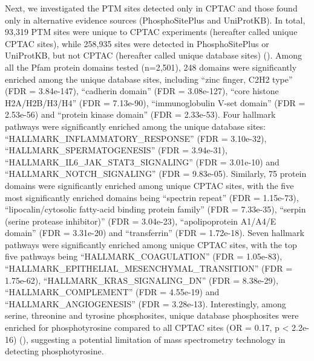 Next, we investigated the PTM sites detected only in CPTAC and those found only in alternative evidence sources (PhosphoSitePlus and UniProtKB). In total, 93,319 PTM sites were unique to CPTAC experiments (hereafter called unique CPTAC sites), while 258,935 sites were detected in PhosphoSitePlus or UniProtKB, but not CPTAC (hereafter called unique database sites) ().
Among all the Pfam protein domains tested (n=2,501),  248 domains were significantly enriched among the unique database sites, including ``zinc finger, C2H2 type'' (FDR = 3.84e-147), ``cadherin domain'' (FDR = 3.08e-127), ``core histone H2A/H2B/H3/H4'' (FDR = 7.13e-90), ``immunoglobulin V-set domain'' (FDR = 2.53e-56) and “protein kinase domain” (FDR = 2.33e-53).
Four hallmark pathways were significantly enriched among the unique database sites: ``HALLMARK\_INFLAMMATORY\_RESPONSE'' (FDR = 3.10e-32), ``HALLMARK\_SPERMATOGENESIS'' (FDR = 3.94e-31), ``HALLMARK\_IL6\_JAK\_STAT3\_SIGNALING'' (FDR = 3.01e-10) and ``HALLMARK\_NOTCH\_SIGNALING'' (FDR = 9.83e-05).
Similarly, 75 protein domains were significantly enriched among unique CPTAC sites, with the five most significantly enriched domains being ``spectrin repeat'' (FDR = 1.15e-73), ``lipocalin/cytosolic fatty-acid binding protein family'' (FDR = 7.33e-35), ``serpin (serine protease inhibitor)'' (FDR = 3.04e-23), ``apolipoprotein A1/A4/E domain'' (FDR = 3.31e-20) and ``transferrin'' (FDR = 1.72e-18).
Seven hallmark pathways were significantly enriched among unique CPTAC sites, with the top five pathways being ``HALLMARK\_COAGULATION'' (FDR = 1.05e-83), ``HALLMARK\_EPITHELIAL\_MESENCHYMAL\_TRANSITION'' (FDR = 1.75e-62), ``HALLMARK\_KRAS\_SIGNALING\_DN'' (FDR = 8.38e-29), ``HALLMARK\_COMPLEMENT'' (FDR = 4.55e-19) and ``HALLMARK\_ANGIOGENESIS'' (FDR = 3.28e-13).
Interestingly, among serine, threonine and tyrosine phosphosites, unique database phosphosites were enriched for phosphotyrosine compared to all CPTAC sites (OR = 0.17, p < 2.2e-16) (), suggesting a potential limitation of mass spectrometry technology in detecting phosphotyrosine.


